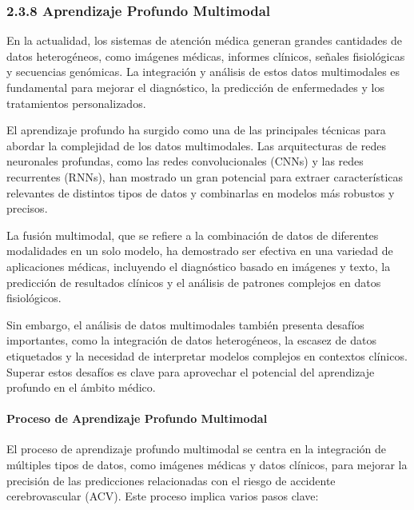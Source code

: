 \subsubsection{2.3.8 Aprendizaje Profundo Multimodal}
En la actualidad, los sistemas de atención médica generan grandes cantidades de datos heterogéneos, como imágenes médicas, informes clínicos, señales fisiológicas y secuencias genómicas. La integración y análisis de estos datos multimodales es fundamental para mejorar el diagnóstico, la predicción de enfermedades y los tratamientos personalizados.
\newline

El aprendizaje profundo ha surgido como una de las principales técnicas para abordar la complejidad de los datos multimodales. Las arquitecturas de redes neuronales profundas, como las redes convolucionales (CNNs) y las redes recurrentes (RNNs), han mostrado un gran potencial para extraer características relevantes de distintos tipos de datos y combinarlas en modelos más robustos y precisos.
\newline

La fusión multimodal, que se refiere a la combinación de datos de diferentes modalidades en un solo modelo, ha demostrado ser efectiva en una variedad de aplicaciones médicas, incluyendo el diagnóstico basado en imágenes y texto, la predicción de resultados clínicos y el análisis de patrones complejos en datos fisiológicos.
\newline

Sin embargo, el análisis de datos multimodales también presenta desafíos importantes, como la integración de datos heterogéneos, la escasez de datos etiquetados y la necesidad de interpretar modelos complejos en contextos clínicos. Superar estos desafíos es clave para aprovechar el potencial del aprendizaje profundo en el ámbito médico.
\newline

\paragraph{Proceso de Aprendizaje Profundo Multimodal}

El proceso de aprendizaje profundo multimodal se centra en la integración de múltiples tipos de datos, como imágenes médicas y datos clínicos, para mejorar la precisión de las predicciones relacionadas con el riesgo de accidente cerebrovascular (ACV). Este proceso implica varios pasos clave:

